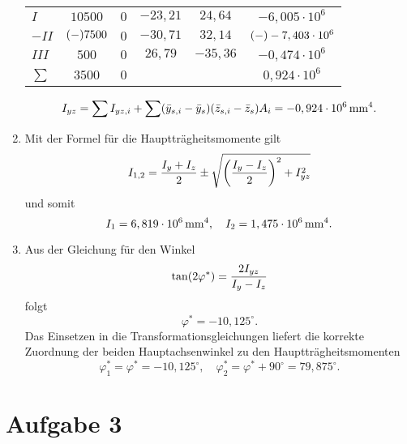 \documentclass{exercise}
\begin{document}
\begin{enumerate}
\begin{center}
\begin{tabular}{lccccc}
                \(I\) & \(10500\) & \(0\) & \(-23,21\) & \(24,64\) & \(-6,005 \cdot 10^6\)\\
                \(-II\) & \(\parentheses*{-}7500\) & \(0\) & \(-30,71\) & \(32,14\) & \(\parentheses*{-}-7,403 \cdot 10^6\)\\
                \(III\) & \(500\) & \(0\) & \(26,79\) & \(-35,36\) & \(-0,474 \cdot 10^6\)\\
                \midrule
                \(\sum\) & \(3500\) & \(0\) & & & \(0,924 \cdot 10^6\)\\
                \bottomrule
            \end{tabular}
        \end{center}
        \[
            I_{yz} = \sum I_{yz, i} + \sum\parentheses*{\bar{y}_{s, i} - \bar{y}_s}\parentheses*{\bar{z}_{s, i} - \bar{z}_s} A_i = -0,924 \cdot 10^6\sis{\milli\meter\tothe{4}}.
        \]
        \item Mit der Formel für die Hauptträgheitsmomente gilt
        \[
            I_{1, 2} = \frac{I_y + I_z}{2} \pm \sqrt{\parentheses*{\frac{I_y - I_z}{2}}^2 + I_{yz}^2}
        \]
        und somit
        \[
            I_1 = 6,819 \cdot 10^6\sis{\milli\meter\tothe{4}}, \quad I_2 = 1,475 \cdot 10^6\sis{\milli\meter\tothe{4}}.
        \]
        \item Aus der Gleichung für den Winkel
        \[
            \tan\parentheses*{2\varphi^*} = \frac{2I_{yz}}{I_y - I_z}
        \]
        folgt
        \[
            \varphi^* = -10,125^\circ.
        \]
        Das Einsetzen in die Transformationsgleichungen liefert die korrekte Zuordnung der beiden Hauptachsenwinkel zu den Hauptträgheitsmomenten
        \[
            \varphi_1^* = \varphi^* = -10,125^\circ, \quad \varphi_2^* = \varphi^* + 90^\circ = 79,875^\circ.
        \]
    \end{enumerate}


    \section*{Aufgabe 3}
\end{document}
